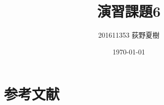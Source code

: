 \documentclass{ltjsarticle}
\title{演習課題6}
\author{201611353 荻野夏樹}
\date{\today}
\begin{document}
\section{参考文献}
\end{document}
